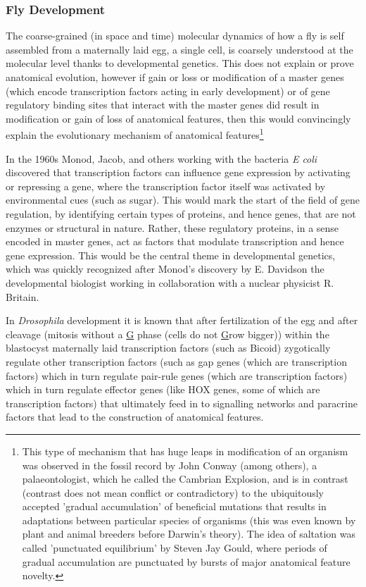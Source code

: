 \subsubsection{Fly Development}

The coarse-grained (in space and time) molecular dynamics of how a fly is self assembled from a maternally laid egg, a single cell, is coarsely understood at the molecular level thanks to developmental genetics.  This does not explain or prove anatomical evolution, however if gain or loss or modification of a master genes (which encode transcription factors acting in early development) or of gene regulatory binding sites that interact with the master genes did result in modification or gain of loss of anatomical features, then this would convincingly explain the evolutionary mechanism of anatomical features\footnote{This type of mechanism that has huge leaps in modification of an organism was observed in the fossil record by John Conway (among others), a palaeontologist, which he called the Cambrian Explosion, and is in contrast (contrast does not mean conflict or contradictory) to the ubiquitously accepted 'gradual accumulation' of beneficial mutations that results in adaptations between particular species of organisms (this was even known by plant and animal breeders before Darwin's theory).  The idea of saltation was called 'punctuated equilibrium' by Steven Jay Gould, where periods of gradual accumulation are punctuated by bursts of major anatomical feature novelty.}  

In the 1960s Monod, Jacob, and others working with the bacteria \textit{E coli} discovered that transcription factors can influence gene expression by activating or repressing a gene, where the transcription factor itself was activated by environmental cues (such as sugar)\cite{pmid13718526}.  This would mark the start of the field of gene regulation, by identifying certain types of proteins, and hence genes, that are not enzymes or structural in nature.  Rather, these regulatory proteins, in a sense encoded in master genes, act as factors that modulate transcription and hence gene expression.  This would be the central theme in developmental genetics, which was quickly recognized after Monod's discovery by E. Davidson the developmental biologist working in collaboration with a nuclear physicist R. Britain\cite{pmid5160087}.     


In \textit{Drosophila} development it is known that after fertilization of the egg and after cleavage (mitosis without a \underline{G} phase (cells do not \underline{G}row bigger)) within the blastocyst maternally laid transcription factors (such as Bicoid) zygotically regulate other transcription factors (such as gap genes (which are transcription factors) which in turn regulate pair-rule genes (which are transcription factors) which in turn regulate effector genes (like HOX genes, some of which are transcription factors) that ultimately feed in to signalling networks and paracrine factors that lead to the construction of anatomical features.  

